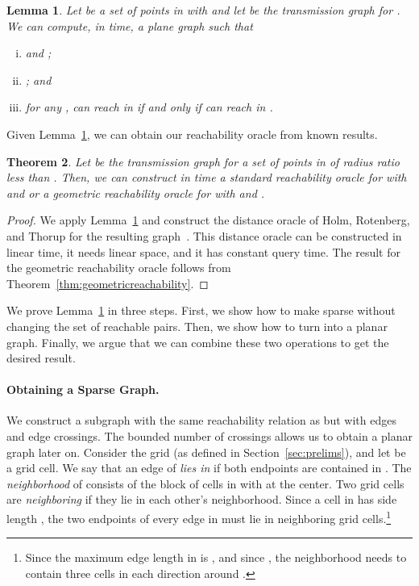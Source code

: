 \documentclass[11pt,a4paper]{paper}
\newtheorem{theorem}{Theorem}[section]
\newtheorem{lemma}[theorem]{Lemma}
\begin{document}
\begin{lemma}\label{lem:planarization}
Let  be a set of  points in  with  and let
 be the transmission graph for  . We can compute, in   time,
 a plane
graph  such that
\begin{enumerate}[(i)]
\item  and ;
\item ; and
\item for any ,  can reach  in  if and only if  can
reach  in .
\end{enumerate}
\end{lemma}
Given Lemma~\ref{lem:planarization}, we can obtain our reachability
oracle from known results.

\begin{theorem}
\label{thm:2doraclesmall}
Let  be the transmission graph for a set  of
 points in  of radius ratio  less than
.
Then, we can construct in
 time a standard reachability oracle for  with 
and  or a geometric reachability oracle for  with  and .
\end{theorem}
\begin{proof}
We apply Lemma~\ref{lem:planarization}
and construct the distance oracle of Holm, Rotenberg, and Thorup for
the resulting graph~\cite{Holm2015}.
This distance oracle can be constructed in linear time, it needs
linear space, and it has constant query time. The result for the geometric
reachability oracle follows from Theorem~\ref{thm:geometricreachability}.
\end{proof}

We prove
Lemma~\ref{lem:planarization} in three steps. First, we show how to
make  sparse without changing the set of
reachable  pairs. Then, we show how to turn  into a planar graph.
Finally, we argue that we can combine these two operations to
get the desired result.

\paragraph*{Obtaining a Sparse Graph.}
We construct a subgraph
 with the same reachability relation as  but with
 edges and  edge crossings.
The bounded number of crossings allows us to obtain a planar
graph later on.
Consider the grid  (as defined in Section~\ref{sec:prelims}), 
and let  be a grid cell.
We say that an edge  of  \emph{lies in}
 if both endpoints are contained in
.
The \emph{neighborhood}  of  consists of
the  block of cells in  with  at the center.
Two grid cells are \emph{neighboring} if they lie in each
other's neighborhood.
Since a cell in  has side length ,
the two endpoints of every edge in  must lie in neighboring
grid cells.\footnote{Since the maximum edge length in  is ,
and since ,
the neighborhood  needs to contain three cells in each
direction around .}
\end{document}
